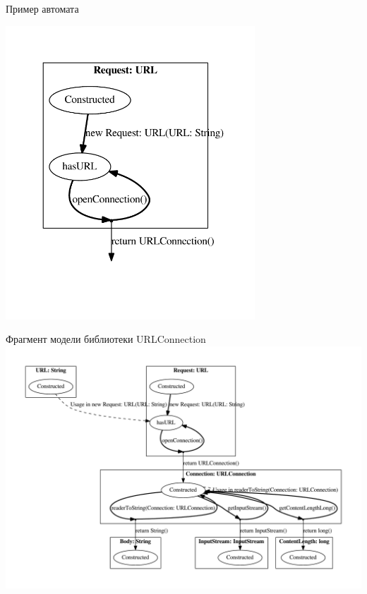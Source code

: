 \documentclass[12pt]{beamer}
\begin{document}
\begin{frame}{Пример автомата}
\begin{center}
	\includegraphics[width=0.7\textwidth]{javaSmall.pdf}
\end{center}
\end{frame}

\begin{frame}{Фрагмент модели библиотеки URLConnection}
	\includegraphics[width=\textwidth]{java.pdf}
\end{frame}
\end{document}
